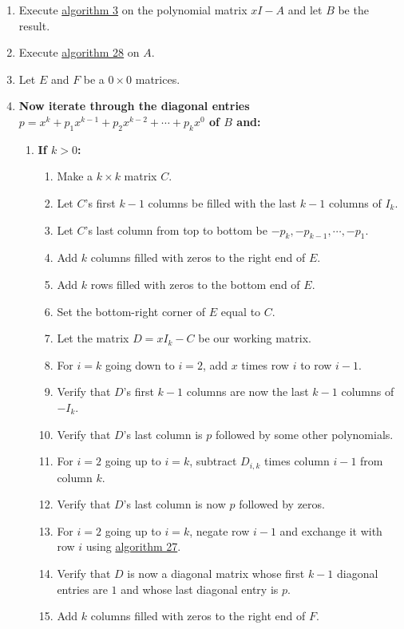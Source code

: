 \documentclass[twocolumn]{article}
\begin{document}
			\begin{enumerate}
				\item Execute \hyperref[sec:algorithm 3]{algorithm 3} on the polynomial matrix $xI-A$ and let $B$ be the result.
				\item Execute \hyperref[sec:algorithm 28]{algorithm 28} on $A$.
				\item Let $E$ and $F$ be a $0\times 0$ matrices.
				\item \textbf{Now iterate through the diagonal entries $p=x^k+p_1x^{k-1}+p_2x^{k-2}+\cdots+p_kx^0$ of $B$ and:}
				\begin{enumerate}
					\item \textbf{If $k>0$:}
					\begin{enumerate}
						\item Make a $k\times k$ matrix $C$.
						\item Let $C$'s first $k-1$ columns be filled with the last $k-1$ columns of $I_k$.
						\item Let $C$'s last column from top to bottom be $-p_k, -p_{k-1},\cdots,-p_1$.
						\item Add $k$ columns filled with zeros to the right end of $E$.
						\item Add $k$ rows filled with zeros to the bottom end of $E$.
						\item Set the bottom-right corner of $E$ equal to $C$.
						\item Let the matrix $D=xI_k-C$ be our working matrix.
						\item For $i=k$ going down to $i=2$, add $x$ times row $i$ to row $i-1$.
						\item Verify that $D$'s first $k-1$ columns are now the last $k-1$ columns of $-I_k$.
						\item Verify that $D$'s last column is $p$ followed by some other polynomials.
						\item For $i=2$ going up to $i=k$, subtract $D_{i, k}$ times column $i-1$ from column $k$.
						\item Verify that $D$'s last column is now $p$ followed by zeros.
						\item For $i=2$ going up to $i=k$, negate row $i-1$ and exchange it with row $i$ using \hyperref[sec:algorithm 27]{algorithm 27}.
						\item Verify that $D$ is now a diagonal matrix whose first $k-1$ diagonal entries are $1$ and whose last diagonal entry is $p$.
						\item Add $k$ columns filled with zeros to the right end of $F$.

\end{enumerate}
\end{enumerate}
\end{enumerate}
\end{document}
